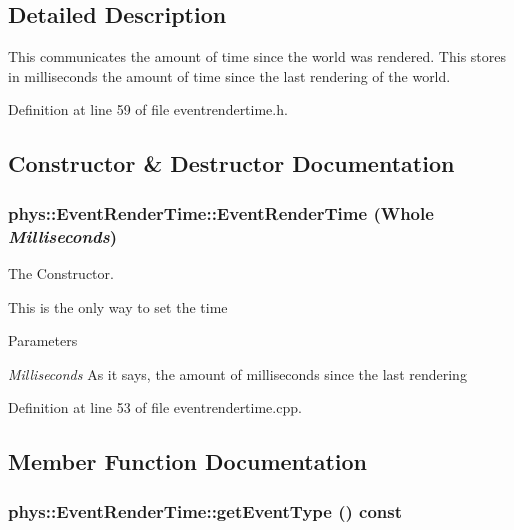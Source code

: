 \subsection{Detailed Description}
This communicates the amount of time since the world was rendered. This stores in milliseconds the amount of time since the last rendering of the world. 

Definition at line 59 of file eventrendertime.h.



\subsection{Constructor \& Destructor Documentation}
\hypertarget{classphys_1_1EventRenderTime_af2384f7b09bbea42dcd2539a9e1747fd}{
\subsubsection[{EventRenderTime}]{\setlength{\rightskip}{0pt plus 5cm}phys::EventRenderTime::EventRenderTime (Whole {\em Milliseconds})}}
\label{d3/d8b/classphys_1_1EventRenderTime_af2384f7b09bbea42dcd2539a9e1747fd}


The Constructor. 

This is the only way to set the time 
\begin{DoxyParams}{Parameters}
\item[{\em Milliseconds}]As it says, the amount of milliseconds since the last rendering \end{DoxyParams}


Definition at line 53 of file eventrendertime.cpp.



\subsection{Member Function Documentation}
\hypertarget{classphys_1_1EventRenderTime_a66918bf3793196899621e4442a6f7a57}{
\subsubsection[{getEventType}]{ phys::EventRenderTime::getEventType () const}}
\label{d3/d8b/classphys_1_1EventRenderTime_a66918bf3793196899621e4442a6f7a57}


